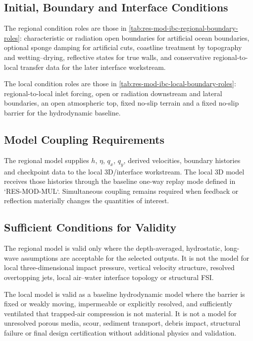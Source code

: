 \subsection{Initial, Boundary and Interface Conditions}
\label{sec:res-mod-spec-initial-boundary-interface-conditions}

The regional condition roles are those in
\cref{tab:res-mod-ibc-regional-boundary-roles}: characteristic or
radiation open boundaries for artificial ocean boundaries, optional
sponge damping for artificial cuts, coastline treatment by topography
and wetting--drying, reflective states for true walls, and conservative
regional-to-local transfer data for the later interface workstream.

The local condition roles are those in
\cref{tab:res-mod-ibc-local-boundary-roles}: regional-to-local inlet
forcing, open or radiation downstream and lateral boundaries, an open
atmospheric top, fixed no-slip terrain and a fixed no-slip barrier for
the hydrodynamic baseline.

\subsection{Model Coupling Requirements}
\label{sec:res-mod-spec-model-coupling-requirements}

The regional model supplies $h$, $\eta$, $q_x$, $q_y$, derived
velocities, boundary histories and checkpoint data to the local
3D/interface workstream. The local 3D model receives those histories
through the baseline one-way replay mode defined in `RES-MOD-MUL`.
Simultaneous coupling remains required when feedback or reflection
materially changes the quantities of interest.

\subsection{Sufficient Conditions for Validity}
\label{sec:res-mod-spec-sufficient-conditions-validity}

The regional model is valid only where the depth-averaged,
hydrostatic, long-wave assumptions are acceptable for the selected
outputs. It is not the model for local three-dimensional impact
pressure, vertical velocity structure, resolved overtopping jets, local
air--water interface topology or structural FSI.

The local model is valid as a baseline hydrodynamic model where the
barrier is fixed or weakly moving, impermeable or explicitly resolved,
and sufficiently ventilated that trapped-air compression is not
material. It is not a model for unresolved porous media, scour,
sediment transport, debris impact, structural failure or final design
certification without additional physics and validation.

